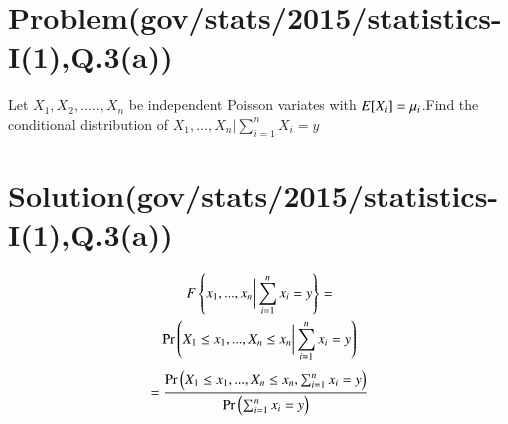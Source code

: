 \documentclass[journal,12pt,twocolumn]{IEEEtran}
\begin{document}
\section{Problem(gov/stats/2015/statistics-I(1),Q.3(a))}
Let $X_1,X_2,.....,X_n$ be independent Poisson variates with $E[ X_i ]=\mu_i$.Find the conditional distribution of $X_1,...,X_n\biggr\vert\sum_{i=1}^{n}X_i=y$
\section{Solution(gov/stats/2015/statistics-I(1),Q.3(a))}
\begin{multline}
    F\left\{x_1,...,x_n\biggr\vert\sum_{i=1}^{n}x_i=y\right\}=\\
    \Pr\left(X_1\leq x_1,...,X_n\leq x_n\biggr\vert\sum_{i=1}^{n}x_i=y\right)
\end{multline}
\begin{align}
    =\frac{\Pr\left(X_1\leq x_1,...,X_n\leq x_n,\sum_{i=1}^{n}x_i=y\right)}{\Pr\left(\sum_{i=1}^{n}x_i=y\right)}
    \label{num}
\end{align}
\end{document}
